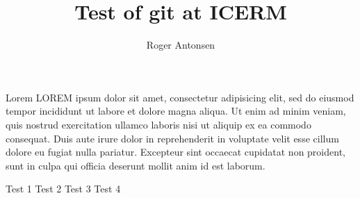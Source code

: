 \documentclass[12pt,a4paper]{article}
\author{Roger Antonsen}
\title{Test of git at ICERM}
\begin{document}
\maketitle

Lorem LOREM ipsum dolor sit amet, consectetur adipisicing elit, sed do eiusmod tempor incididunt ut labore et dolore magna aliqua. Ut enim ad minim veniam, quis nostrud exercitation ullamco laboris nisi ut aliquip ex ea commodo consequat. Duis aute irure dolor in reprehenderit in voluptate velit esse cillum dolore eu fugiat nulla pariatur. Excepteur sint occaecat cupidatat non proident, sunt in culpa qui officia deserunt mollit anim id est laborum.

Test 1
Test 2
Test 3
Test 4
\end{document}

